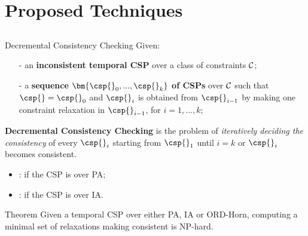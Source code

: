 \section{Proposed Techniques}

\subsection{}
\begin{frame}{Decremental Consistency Checking}
	Given:
	\begin{itemize}
		\item[-] \small{an \textbf{inconsistent temporal CSP} \csp{} over a class of constraints
$\cal C$};
		\item[-] \small{a \textbf{sequence $\bm{\csp{}_{0}, ..., \csp{}_k}$ of CSPs} over $\cal C$ such that $\csp{}= \csp{}_{0}$ and $\csp{}_i$ is obtained from $\csp{}_{i-1}$ by making one constraint relaxation in $\csp{}_{i-1}$, for $i = 1, ..., k$};
	\end{itemize}
	\textbf{\color{blue} Decremental Consistency Checking} is the problem of \textit{iteratively deciding the consistency} of every $\csp{}_i$ starting from $\csp{}_1$ until $i = k$ or $\csp{}_i$ becomes consistent.
	
	
	\begin{itemize}
		\item \dpsat{}: if the CSP is over PA;
		\item \disat{}: if the CSP is over IA.
	\end{itemize}
	
	\begin{alertblock}{Theorem}
		Given a temporal CSP \csp{} over either PA, IA or ORD-Horn, computing a minimal set of relaxations making \csp{} consistent is NP-hard.
	\end{alertblock}

\end{frame}

